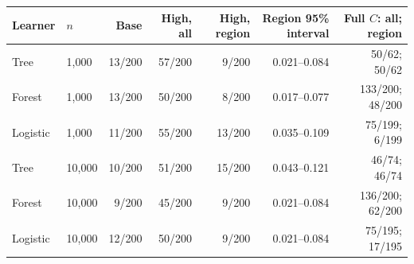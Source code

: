 \begin{tabular}{@{}llrrrrr@{}}
\toprule
Learner & $n$ & Base & High, all & High, region & Region 95\% interval & Full $C$: all; region \\
\midrule
Tree & 1,000 & 13/200 & 57/200 & 9/200 & 0.021--0.084 & 50/62; 50/62 \\
Forest & 1,000 & 13/200 & 50/200 & 8/200 & 0.017--0.077 & 133/200; 48/200 \\
Logistic & 1,000 & 11/200 & 55/200 & 13/200 & 0.035--0.109 & 75/199; 6/199 \\
Tree & 10,000 & 10/200 & 51/200 & 15/200 & 0.043--0.121 & 46/74; 46/74 \\
Forest & 10,000 & 9/200 & 45/200 & 9/200 & 0.021--0.084 & 136/200; 62/200 \\
Logistic & 10,000 & 12/200 & 50/200 & 9/200 & 0.021--0.084 & 75/195; 17/195 \\
\bottomrule
\end{tabular}
